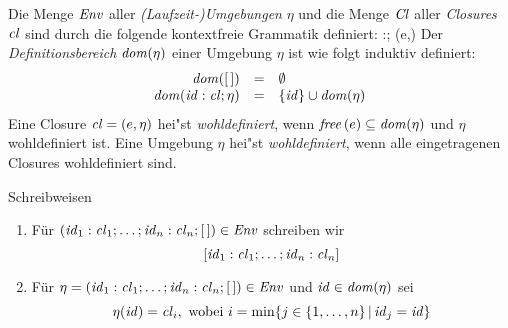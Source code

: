 \documentclass[12pt,fleqn]{article}
\newcommand{\Cl}{\name{Cl}}
\newcommand{\cl}{\name{cl}}
\begin{document}
\begin{definition}
  Die Menge ${\text{\it Env\/}}$ aller {\em (Laufzeit-)Umgebungen} $\eta$ und die Menge $\Cl$ aller {\em Closures} $\cl$ sind
  durch die folgende kontextfreie Grammatik definiert:
  \bgram
  \eta \is [\,] \mid \id:\cl;\eta \n
  \cl \is (e,\eta)
  \egram
  Der {\em Definitionsbereich} ${\text{\it dom\/}}(\eta)$ einer Umgebung $\eta$ ist wie folgt induktiv definiert:
  \[\begin{array}{rcl}
    \dom{[\,]} &=& \emptyset \\
    \dom{\id:\cl;\eta} &=& \{\id\} \cup \dom{\eta}
  \end{array}\]
  Eine Closure $\cl = (e,\eta)$ hei"st {\em wohldefiniert}, wenn ${\text{\it free\/}}\,(e) \subseteq {\text{\it dom\/}}(\eta)$ und
  $\eta$ wohldefiniert ist. Eine Umgebung $\eta$ hei"st {\em wohldefiniert}, wenn alle eingetragenen
  Closures wohldefiniert sind.
\end{definition}

\noindent Schreibweisen
\begin{enumerate}
\item F\"ur $(\id_1:\cl_1;\ldots;\id_n:\cl_n;[\,])\in\Env$ schreiben wir
  \[
  [\id_1:\cl_1;\ldots;\id_n:\cl_n]
  \]
\item F\"ur $\eta=(\id_1:\cl_1;\ldots;\id_n:\cl_n;[\,])\in\Env$ und ${\text{\it id\/}}\in{\text{\it dom\/}}(\eta)$ sei
  \[
  \eta(\id) = \cl_i, \text{ wobei } i = \min\{j \in \{1,\ldots,n\}\,|\,\id_j=\id\}
  \]
\end{enumerate}
\end{document}
